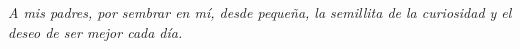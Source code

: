 \begin{dedication}
    \textit{ A mis padres, por sembrar en mí, desde pequeña, la semillita de la curiosidad y el deseo de ser mejor cada día.}
\end{dedication}